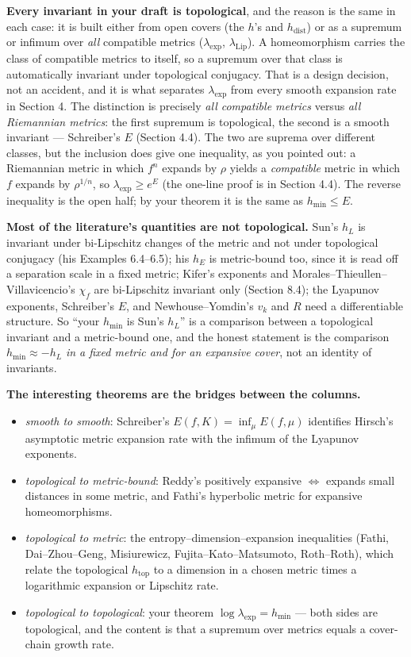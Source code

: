 \documentclass[
]{article}
\providecommand{\tightlist}{%
  \setlength{\itemsep}{0pt}\setlength{\parskip}{0pt}}
\begin{document}
\textbf{Every invariant in your draft is topological}, and the reason is
the same in each case: it is built either from open covers (the \(h\)'s
and \(h_{\mathrm{dist}}\)) or as a supremum or infimum over \emph{all}
compatible metrics (\(\lambda_{\exp}\), \(\lambda_{\mathrm{Lip}}\)). A
homeomorphism carries the class of compatible metrics to itself, so a
supremum over that class is automatically invariant under topological
conjugacy. That is a design decision, not an accident, and it is what
separates \(\lambda_{\exp}\) from every smooth expansion rate in Section
4. The distinction is precisely \emph{all compatible metrics} versus
\emph{all Riemannian metrics}: the first supremum is topological, the
second is a smooth invariant --- Schreiber's \(E\) (Section 4.4). The
two are suprema over different classes, but the inclusion does give one
inequality, as you pointed out: a Riemannian metric in which \(f^n\)
expands by \(\rho\) yields a \emph{compatible} metric in which \(f\)
expands by \(\rho^{1/n}\), so \(\lambda_{\exp}\ge e^{E}\) (the one-line
proof is in Section 4.4). The reverse inequality is the open half; by
your theorem it is the same as \(h_{\min}\le E\).

\textbf{Most of the literature's quantities are not topological.} Sun's
\(h_L\) is invariant under bi-Lipschitz changes of the metric and not
under topological conjugacy (his Examples 6.4--6.5); his \(h_E\) is
metric-bound too, since it is read off a separation scale in a fixed
metric; Kifer's exponents and Morales--Thieullen--Villavicencio's
\(\chi_f\) are bi-Lipschitz invariant only (Section 8.4); the Lyapunov
exponents, Schreiber's \(E\), and Newhouse--Yomdin's \(v_k\) and \(R\)
need a differentiable structure. So ``your \(h_{\min}\) is Sun's
\(h_L\)'' is a comparison between a topological invariant and a
metric-bound one, and the honest statement is the comparison
\(h_{\min}\approx-h_L\) \emph{in a fixed metric and for an expansive
cover}, not an identity of invariants.

\textbf{The interesting theorems are the bridges between the columns.}

\begin{itemize}
\tightlist
\item
  \emph{smooth to smooth}: Schreiber's \(E(f,K)=\inf_\mu E(f,\mu)\)
  identifies Hirsch's asymptotic metric expansion rate with the infimum
  of the Lyapunov exponents.
\item
  \emph{topological to metric-bound}: Reddy's positively expansive
  \(\Leftrightarrow\) expands small distances in some metric, and
  Fathi's hyperbolic metric for expansive homeomorphisms.
\item
  \emph{topological to metric}: the entropy--dimension--expansion
  inequalities (Fathi, Dai--Zhou--Geng, Misiurewicz,
  Fujita--Kato--Matsumoto, Roth--Roth), which relate the topological
  \(h_{\mathrm{top}}\) to a dimension in a chosen metric times a
  logarithmic expansion or Lipschitz rate.
\item
  \emph{topological to topological}: your theorem
  \(\log\lambda_{\exp}=h_{\min}\) --- both sides are topological, and
  the content is that a supremum over metrics equals a cover-chain
  growth rate.
\end{itemize}
\end{document}
